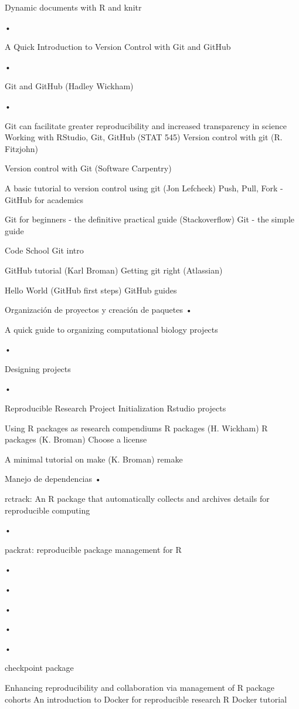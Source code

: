 \documentclass[]{tufte-handout}
\begin{document}
Dynamic documents with R and knitr

•

A Quick Introduction to Version Control with Git and GitHub

•

Git and GitHub (Hadley Wickham)

•

Git can facilitate greater reproducibility and increased transparency in
science Working with RStudio, Git, GitHub (STAT 545) Version control
with git (R. Fitzjohn)

Version control with Git (Software Carpentry)

A basic tutorial to version control using git (Jon Lefcheck) Push, Pull,
Fork - GitHub for academics

Git for beginners - the definitive practical guide (Stackoverflow) Git -
the simple guide

Code School Git intro

GitHub tutorial (Karl Broman) Getting git right (Atlassian)

Hello World (GitHub first steps) GitHub guides

Organización de proyectos y creación de paquetes •

A quick guide to organizing computational biology projects

•

Designing projects

•

Reproducible Research Project Initialization Rstudio projects

Using R packages as research compendiums R packages (H. Wickham) R
packages (K. Broman) Choose a license

A minimal tutorial on make (K. Broman) remake

Manejo de dependencias •

rctrack: An R package that automatically collects and archives details
for reproducible computing

•

packrat: reproducible package management for R

•

•

•

•

•

checkpoint package

Enhancing reproducibility and collaboration via management of R package
cohorts An introduction to Docker for reproducible research R Docker
tutorial
\end{document}
